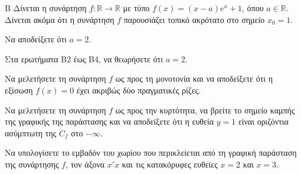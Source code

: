 \begin{thema}{Β}
Δίνεται η συνάρτηση $f: \mathbb{R} \to \mathbb{R}$ με τύπο $f(x) = (x-a)e^x + 1$, όπου $a \in \mathbb{R}$. Δίνεται ακόμα ότι η συνάρτηση $f$ παρουσιάζει τοπικό ακρότατο στο σημείο $x_0 = 1$.

\begin{erwthma}
\item Να αποδείξετε ότι $a = 2$. 

Στα ερωτήματα Β2 έως Β4, να θεωρήσετε ότι $a = 2$.
\item Να μελετήσετε τη συνάρτηση $f$ ως προς τη μονοτονία και να αποδείξετε ότι η εξίσωση $f(x) = 0$ έχει ακριβώς δύο πραγματικές ρίζες. 
\item Να μελετήσετε τη συνάρτηση $f$ ως προς την κυρτότητα, να βρείτε το σημείο καμπής της γραφικής της παράστασης και να αποδείξετε ότι η ευθεία $y = 1$ είναι οριζόντια ασύμπτωτη της $C_f$ στο $-\infty$. 
\item Να υπολογίσετε το εμβαδόν του χωρίου που περικλείεται από τη γραφική παράσταση της συνάρτησης $f$, τον άξονα $x'x$ και τις κατακόρυφες ευθείες $x = 2$ και $x = 3$. 
\end{erwthma}
\end{thema}
